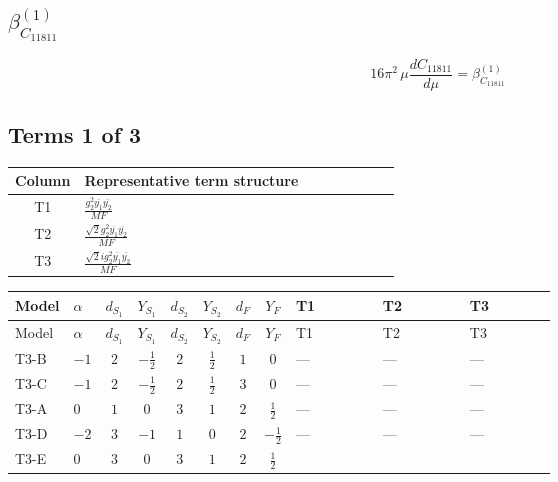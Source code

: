\documentclass[8pt]{article}
\begin{document}
\begin{landscape}
\section*{$\beta_{C_{11811}}^{(1)}$}
\[16\pi^2\,\mu\frac{d C_{11811}}{d\mu}=\beta_{C_{11811}}^{(1)}\]
\subsection*{Terms 1 of 3}
\begin{center}
\begin{tabular}{@{}c >{\raggedright\arraybackslash}p{0.82\linewidth}@{}}
\toprule
Column & Representative term structure \\
\midrule
T1 & \(\displaystyle \frac{g_{2}^{2} \overline{y_{1}} \overline{y_{2}}}{MF}\) \\
\midrule
T2 & \(\displaystyle \frac{\sqrt{2} g_{2}^{2} \overline{y_{1}} \overline{y_{2}}}{MF}\) \\
\midrule
T3 & \(\displaystyle \frac{\sqrt{2} i g_{2}^{2} \overline{y_{1}} \overline{y_{2}}}{MF}\) \\
\midrule
\bottomrule
\end{tabular}
\end{center}
\smallskip
\tiny
\begin{longtable}{@{}llcccccc >{\raggedright\arraybackslash}p{0.21\linewidth} >{\raggedright\arraybackslash}p{0.21\linewidth} >{\raggedright\arraybackslash}p{0.21\linewidth}@{}}
\toprule
Model & $\alpha$ & $d_{S_1}$ & $Y_{S_1}$ & $d_{S_2}$ & $Y_{S_2}$ & $d_F$ & $Y_F$ & T1 & T2 & T3 \\
\midrule
\endfirsthead
\toprule
Model & $\alpha$ & $d_{S_1}$ & $Y_{S_1}$ & $d_{S_2}$ & $Y_{S_2}$ & $d_F$ & $Y_F$ & T1 & T2 & T3 \\
\midrule
\endhead
T3-B & $-1$ & $2$ & $-\frac{1}{2}$ & $2$ & $\frac{1}{2}$ & $1$ & $0$ & --- & --- & --- \\
\midrule
T3-C & $-1$ & $2$ & $-\frac{1}{2}$ & $2$ & $\frac{1}{2}$ & $3$ & $0$ & --- & --- & --- \\
\midrule
T3-A & $0$ & $1$ & $0$ & $3$ & $1$ & $2$ & $\frac{1}{2}$ & --- & --- & --- \\
\midrule
T3-D & $-2$ & $3$ & $-1$ & $1$ & $0$ & $2$ & $-\frac{1}{2}$ & --- & --- & --- \\
\midrule
T3-E & $0$ & $3$ & $0$ & $3$ & $1$ & $2$ & $\frac{1}{2}$ & \scriptsize\adjustbox{max width=\linewidth}{$\begin{gathered} \frac{g_{2}^{2} \overline{y_{1}} \overline{y_{2}}}{MF}\end{gathered}$} & \scriptsize\adjustbox{max width=\linewidth}{$\begin{gathered} \frac{\sqrt{2} g_{2}^{2} \overline{y_{1}} \overline{y_{2}}}{4 MF}\end{gathered}$} & \scriptsize\adjustbox{max width=\linewidth}{$\begin{gathered} - \frac{49 \sqrt{2} i g_{2}^{2} \overline{y_{1}} \overline{y_{2}}}{16 MF}\end{gathered}$} \\
\midrule
\bottomrule
\end{longtable}
\clearpage

\end{landscape}
\end{document}
